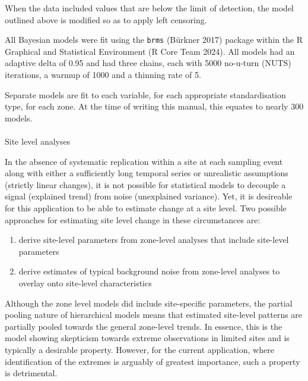 \documentclass[
  8pt,
  a4paper]{article}
\makeatletter
\let\oldparagraph\paragraph
\renewcommand{\paragraph}{
    \@ifstar
      \xxxParagraphStar
      \xxxParagraphNoStar
  }
\newcommand{\xxxParagraphStar}[1]{\oldparagraph*{#1}\mbox{}}
\newcommand{\xxxParagraphNoStar}[1]{\oldparagraph{#1}\mbox{}}
\providecommand{\tightlist}{%
  \setlength{\itemsep}{0pt}\setlength{\parskip}{0pt}}
\makeatother
\begin{document}
When the data included values that are below the limit of detection, the
model outlined above is modified so as to apply left censoring.

All Bayesian models were fit using the \texttt{brms} (Bürkner 2017)
package within the R Graphical and Statistical Environment (R Core Team
2024). All models had an adaptive delta of 0.95 and had three chains,
each with 5000 no-u-turn (NUTS) iterations, a warmup of 1000 and a
thinning rate of 5.

Separate models are fit to each variable, for each appropriate
standardisation type, for each zone. At the time of writing this manual,
this equates to nearly 300 models.

\paragraph{Site level analyses}\label{site-level-analyses}

In the absence of systematic replication within a site at each sampling
event along with either a sufficiently long temporal series or
unrealistic assumptions (strictly linear changes), it is not possible
for statistical models to decouple a signal (explained trend) from noise
(unexplained variance). Yet, it is desireable for this application to be
able to estimate change at a site level. Two possible approaches for
estimating site level change in these circumstances are:

\begin{enumerate}
\def\labelenumi{\arabic{enumi}.}
\tightlist
\item
  derive site-level parameters from zone-level analyses that include
  site-level parameters
\item
  derive estimates of typical background noise from zone-level analyses
  to overlay onto site-level characteristics
\end{enumerate}

Although the zone level models did include site-specific parameters, the
partial pooling nature of hierarchical models means that estimated
site-level patterns are partially pooled towards the general zone-level
trends. In essence, this is the model showing skepticism towards extreme
observations in limited sites and is typically a desirable property.
However, for the current application, where identification of the
extremes is arguably of greatest importance, such a property is
detrimental.
\end{document}
